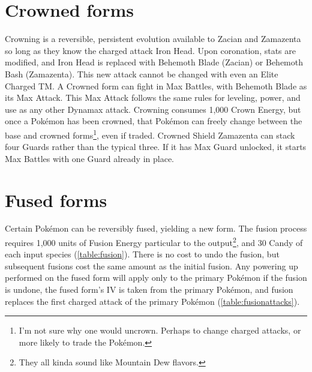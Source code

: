 \section{Crowned forms}
\label{sec:crowned}
Crowning is a reversible, persistent evolution available to Zacian and Zamazenta
 so long as they know the charged attack Iron Head.
Upon coronation, stats are modified, and Iron Head is replaced with Behemoth Blade (Zacian)
  or Behemoth Bash (Zamazenta).
This new attack cannot be changed with even an Elite Charged TM\@.
A Crowned form can fight in Max Battles, with Behemoth Blade as its Max Attack.
This Max Attack follows the same rules for leveling, power, and use as any other Dynamax attack.
Crowning consumes 1,000 Crown Energy, but once a Pokémon has been crowned,
  that Pokémon can freely change between the base and crowned
  forms\footnote{I'm not sure why one would uncrown. Perhaps to change charged attacks,
    or more likely to trade the Pokémon.}, even if traded.
Crowned Shield Zamazenta can stack four Guards rather than the typical three.
If it has Max Guard unlocked, it starts Max Battles with one Guard already in place.



\section{Fused forms}
\label{sec:fusion}
Certain Pokémon can be reversibly fused, yielding a new form.
The fusion process requires 1,000 units of Fusion Energy particular to the output\footnote{They all kinda sound like Mountain Dew flavors.},
 and 30 Candy of each input species (\autoref{table:fusion}).
There is no cost to undo the fusion, but subsequent fusions cost the same amount as the initial fusion.
Any powering up performed on the fused form will apply only to the primary
  Pokémon if the fusion is undone, the fused form's IV is taken from the primary Pokémon,
  and fusion replaces the first charged attack of the primary Pokémon (\autoref{table:fusionattacks}).

